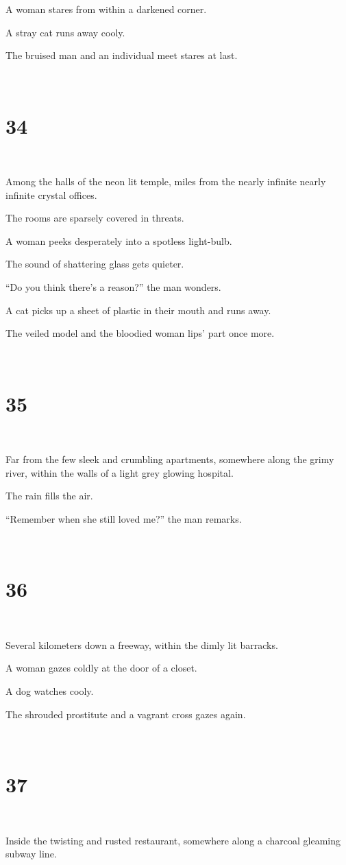 \documentclass{report}
\begin{document}
A woman stares from within a darkened corner.

A stray cat runs away cooly.

The bruised man and an individual meet stares at last.

~
\chapter*{34}
~

Among the halls of the neon lit temple, miles from the nearly infinite nearly infinite crystal offices.

The rooms are sparsely covered in threats.

A woman peeks desperately into a spotless light-bulb.

The sound of shattering glass gets quieter.

``Do you think there's a reason?'' the man wonders.

A cat picks up a sheet of plastic in their mouth and runs away.

The veiled model and the bloodied woman lips' part once more.

~
\chapter*{35}
~

Far from the few sleek and crumbling apartments, somewhere along the grimy river, within the walls of a light grey glowing hospital.

The rain fills the air.

``Remember when she still loved me?'' the man remarks.

~
\chapter*{36}
~

Several kilometers down a freeway, within the dimly lit barracks.

A woman gazes coldly at the door of a closet.

A dog watches cooly.

The shrouded prostitute and a vagrant cross gazes again.

~
\chapter*{37}
~

Inside the twisting and rusted restaurant, somewhere along a charcoal gleaming subway line.
\end{document}
